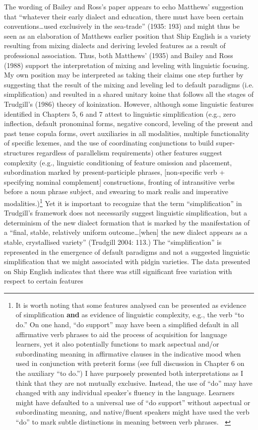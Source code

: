 \begin{styleStandard}
The wording of Bailey and Ross’s paper appears to echo Matthews’ suggestion that “whatever their early dialect and education, there must have been certain conventions…used exclusively in the sea-trade” (1935: 193) and might thus be seen as an elaboration of Matthews earlier position that Ship English is a variety resulting from mixing dialects and deriving leveled features as a result of professional association. Thus, both Matthews’ (1935) and Bailey and Ross (1988) support the interpretation of mixing and leveling with linguistic focusing. My own position may be interpreted as taking their claims one step further by suggesting that the result of the mixing and leveling led to default paradigms (i.e. simplification) and resulted in a shared unitary koine that follows all the stages of Trudgill’s (1986) theory of koinization. However, although some linguistic features identified in Chapters 5, 6 and 7 attest to linguistic simplification (e.g., zero inflection, default pronominal forms, negative concord, leveling of the present and past tense copula forms, overt auxiliaries in all modalities, multiple functionality of specific lexemes, and the use of coordinating conjunctions to build super-structures regardless of parallelism requirements) other features suggest complexity (e.g., linguistic conditioning of feature omission and placement, subordination marked by present-participle phrases, [non-specific verb + specifying nominal complement] constructions, fronting of intransitive verbs before a noun phrase subject, and swearing to mark realis and imperative modalities.)\footnote{ It is worth noting that some features analysed can be presented as evidence of simplification \textbf{and} as evidence of linguistic complexity, e.g., the verb “to do.” On one hand, “do support” may have been a simplified default in all affirmative verb phrases to aid the process of acquisition for language learners, yet it also potentially functions to mark aspectual and/or subordinating meaning in affirmative clauses in the indicative mood when used in conjunction with preterit forms (see full discussion in Chapter 6 on the auxiliary “to do.”) I have purposely presented both interpretations as I think that they are not mutually exclusive. Instead, the use of “do” may have changed with any individual speaker’s fluency in the language. Learners might have defaulted to a universal use of “do support” without aspectual or subordinating meaning, and native/fluent speakers might have used the verb “do” to mark subtle distinctions in meaning between verb phrases. \textbf{\ }} Yet it is important to recognize that the term “simplification” in Trudgill’s framework does not necessarily suggest linguistic simplification, but a determinism of the new dialect formation that is marked by the manifestation of a “final, stable, relatively uniform outcome…[when] the new dialect appears as a stable, crystallised variety” (Trudgill 2004: 113.) The “simplification” is represented in the emergence of default paradigms and not a suggested linguistic simplification that we might associated with pidgin varieties. The data presented on Ship English indicates that there was still significant free variation with respect to certain features 
\end{styleStandard}
